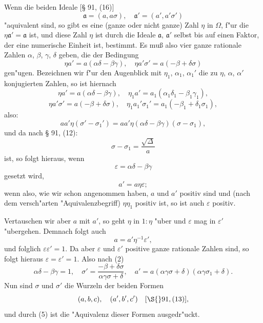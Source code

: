 \documentclass[12pt,a4paper]{article}
\theoremstyle{plain}
\begin{document}
Wenn die beiden Ideale [\S{} 91, (16)]
\begin{equation}
\mathfrak{a} = (a, a\sigma),\quad \mathfrak{a}' = (a', a'\sigma')
\tag{1}
\end{equation}
"aquivalent sind, so gibt es eine (ganze oder nicht ganze) Zahl $\eta$ in $\Omega$, f"ur die $\eta\mathfrak{a}' = \mathfrak{a}$ ist, und diese Zahl $\eta$ ist durch die Ideale $\mathfrak{a}$, $\mathfrak{a}'$ selbst bis auf einen Faktor, der eine numerische Einheit ist, bestimmt. Es mu\ss{} also vier ganze rationale Zahlen $\alpha$, $\beta$, $\gamma$, $\delta$ geben, die der Bedingung
\begin{equation}
\eta a' = a(\alpha\delta - \beta\gamma),\quad \eta a'\sigma' = a(-\beta + \delta\sigma)
\tag{2}
\end{equation}
gen"ugen. Bezeichnen wir f"ur den Augenblick mit $\eta_1$, $\alpha_1$, $\alpha_1'$ die zu $\eta$, $\alpha$, $\alpha'$ konjugierten Zahlen, so ist hiernach
\[
\eta a' = a(\alpha\delta - \beta\gamma),\quad \eta_1 a' = a_1(\alpha_1\delta_1 - \beta_1\gamma_1),
\]
\[
\eta a'\sigma' = a(-\beta + \delta\sigma),\quad \eta_1 a_1'\sigma_1' = a_1(-\beta_1 + \delta_1\sigma_1),
\]
also:
\[
aa'\eta(\sigma' - \sigma_1') = aa'\eta(\alpha\delta - \beta\gamma)(\sigma - \sigma_1),
\]
und da nach \S{} 91, (12):
\begin{equation}
\sigma - \sigma_1 = \frac{\sqrt{\Delta}}{a}
\tag{6}
\end{equation}
ist, so folgt hieraus, wenn
\[
\varepsilon = \alpha\delta - \beta\gamma
\]
gesetzt wird,
\begin{equation}
a' = a\eta\varepsilon;
\tag{3}
\end{equation}
wenn also, wie wir schon angenommen haben, $a$ und $a'$ positiv sind und (nach dem versch"arten "Aquivalenzbegriff) $\eta\eta_1$ positiv ist, so ist auch $\varepsilon$ positiv.

Vertauschen wir aber $a$ mit $a'$, so geht $\eta$ in $1:\eta$ "uber und $\varepsilon$ mag in $\varepsilon'$ "ubergehen. Demnach folgt auch
\begin{equation}
a = a'\eta^{-1}\varepsilon',
\tag{4}
\end{equation}
und folglich $\varepsilon\varepsilon' = 1$. Da aber $\varepsilon$ und $\varepsilon'$ positive ganze rationale Zahlen sind, so folgt hieraus $\varepsilon = \varepsilon' = 1$. Also nach (2)
\begin{equation}
\alpha\delta - \beta\gamma = 1,\quad \sigma' = \frac{-\beta + \delta\sigma}{\alpha\gamma\sigma + \delta},\quad a' = a(\alpha\gamma\sigma + \delta)(\alpha\gamma\sigma_1 + \delta).
\tag{5}
\end{equation}
Nun sind $\sigma$ und $\sigma'$ die Wurzeln der beiden Formen
\[
(a, b, c),\quad (a', b', c') \quad [\S{} 91, (13)],
\]
und durch (5) ist die "Aquivalenz dieser Formen ausgedr"uckt.
\end{document}
